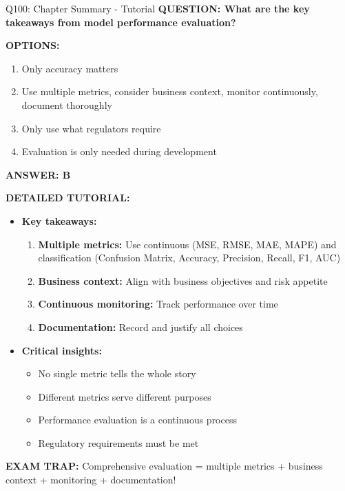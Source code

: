 \documentclass[8pt]{beamer}
\begin{document}
\begin{frame}{Q100: Chapter Summary - Tutorial}
	\fontsize{6.5}{7.5}\selectfont
	\textbf{QUESTION: What are the key takeaways from model performance evaluation?}
	
	\vspace{0.1cm}
	\textbf{OPTIONS:}
	\begin{enumerate}
		\item Only accuracy matters
		\item Use multiple metrics, consider business context, monitor continuously, document thoroughly
		\item Only use what regulators require
		\item Evaluation is only needed during development
	\end{enumerate}
	
	\vspace{0.1cm}
	\textcolor{myblue}{\textbf{ANSWER: B}}
	
	\vspace{0.1cm}
	\textbf{DETAILED TUTORIAL:}
	\begin{itemize}
		\item \textbf{Key takeaways:}
		\begin{enumerate}
			\item \textbf{Multiple metrics:} Use continuous (MSE, RMSE, MAE, MAPE) and classification (Confusion Matrix, Accuracy, Precision, Recall, F1, AUC)
			\item \textbf{Business context:} Align with business objectives and risk appetite
			\item \textbf{Continuous monitoring:} Track performance over time
			\item \textbf{Documentation:} Record and justify all choices
		\end{enumerate}
		\item \textbf{Critical insights:}
		\begin{itemize}
			\item No single metric tells the whole story
			\item Different metrics serve different purposes
			\item Performance evaluation is a continuous process
			\item Regulatory requirements must be met
		\end{itemize}
	\end{itemize}
	
	\textcolor{myred}{\textbf{EXAM TRAP:}} Comprehensive evaluation = \textcolor{myblue}{multiple metrics + business context + monitoring + documentation}!
\end{frame}
\end{document}
